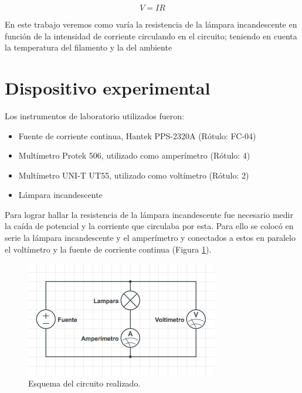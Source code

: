 \documentclass[twoside,twocolumn,a4paper]{article}
\begin{document}
\begin{equation}
\label{eq:ohm2}
V = IR
\end{equation}
\par En este trabajo veremos como var\'ia la resistencia de la l\'ampara incandescente en funci\'on de la intensidad de corriente circulando en el circuito; teniendo en cuenta la temperatura del filamento y la del ambiente


\section{Dispositivo experimental}

Los instrumentos de laboratorio utilizados fueron:
\begin{itemize}
\item 
\label{Fuente} Fuente de corriente continua, Hantek PPS-2320A (R\'otulo: FC-04)
\cite{Fuente}
\item 
\label{amp} Mult\'imetro Protek 506, utilizado como amper\'imetro (R\'otulo: 4)
\cite{amp}
\item 
\label{volt} Mult\'imetro UNI-T UT55, utilizado como volt\'imetro (R\'otulo: 2)
\cite{volt}
\item L\'ampara incandescente
\end{itemize}

Para lograr hallar la resistencia de la l\'ampara incandescente fue necesario medir la ca\'ida de potencial y la corriente que circulaba por esta. Para ello se coloc\'o en serie la l\'ampara incandescente y el amper\'imetro y conectados a estos en paralelo el volt\'imetro y la fuente de corriente continua (Figura \ref{fig:dsp_exp}).\par

\begin{figure}[h]
\includegraphics[width=\linewidth]{dispositivo_experimental.jpg}
\caption{Esquema del circuito realizado.}
\label{fig:dsp_exp}
\end{figure}
\end{document}
